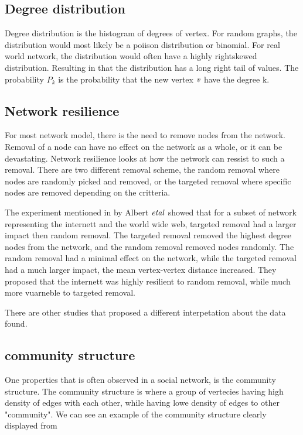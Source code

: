 \subsection{Degree distribution}
Degree distribution is the histogram of degrees of vertex. For random graphs, the distribution would most likely be a poiison distribution or binomial. For real world network, the distribution would often have a highly rightskewed distribution. Resulting in that the distribution has a long right tail of values. The probability $P_k$ is the probability that the new vertex $\it{v}$ have the degree k. 

\subsection{Network resilience}
For most network model, there is the need to remove nodes from the network. Removal of a node can have no effect on the network as a whole, or it can be devastating. Network resilience looks at how the network can ressist to such a removal. There are two different removal scheme, the random removal where nodes are randomly picked and removed, or the targeted removal where specific nodes are removed depending on the critteria. 

The experiment mentioned in \cite{complexNetwork} by Albert $\it{et al}$ showed that for a subset of network representing the internett and the world wide web, targeted removal had a larger impact then random removal. The targeted removal removed the highest degree nodes from the network, and the random removal removed nodes randomly. The random removal had a minimal effect on the network, while the targeted removal had a much larger impact, the mean vertex-vertex distance increased. They proposed that the internett was highly resilient to random removal, while much more vuarneble to targeted removal. 

There are other studies that proposed a different interpetation about the data found.	


\subsection{community structure}
One properties that is often observed in a social network, is the community structure. The community structure is where a group of vertecies having high density of edges with each other, while having lowe density of edges to other "community". We can see an example of the community structure clearly displayed from \cite{RaceSchool2001}

